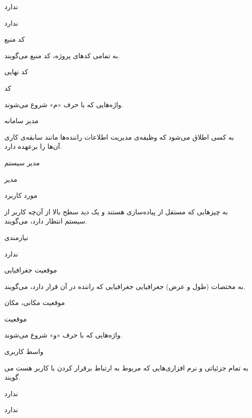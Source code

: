 ندارد

ندارد

\noindent \hrulefill

کد منبع

به تمامی کدهای پروژه، کد منبع می‌گویند.

کد نهایی

کد

\newpage

واژه‌هایی که با حرف «م» شروع می‌شوند.
\noindent \hrulefill

مدیر سامانه

به کسی اطلاق می‌شود که وظیفه‌ی مدیریت اطلاعات راننده‌ها مانند سابقه‌ی کاری آن‌ها را برعهده دارد.

مدیر سیستم

مدیر

\noindent \hrulefill

مورد کاربرد

به چیزهایی که مستقل از پياده‌سازی هستند و يک ديد سطح بالا از آن‌چه كاربر از سيستم انتظار دارد، می‌گویند.

نیازمندی

ندارد

\noindent \hrulefill

موقعیت جغرافیایی

به مختصات (طول و عرض) جغرافیایی جغرافیایی که راننده در آن قرار دارد، می‌گویند.

موقعیت مکانی، مکان

موقعیت

\newpage

واژه‌هایی که با حرف «و» شروع می‌شوند.
\noindent \hrulefill

واسط کاربری

به تمام جزئیاتی و نرم افزاری‌هایی که مربوط به ارتباط برقرار کردن با کاربر هست می گویند.

ندارد

ندارد

